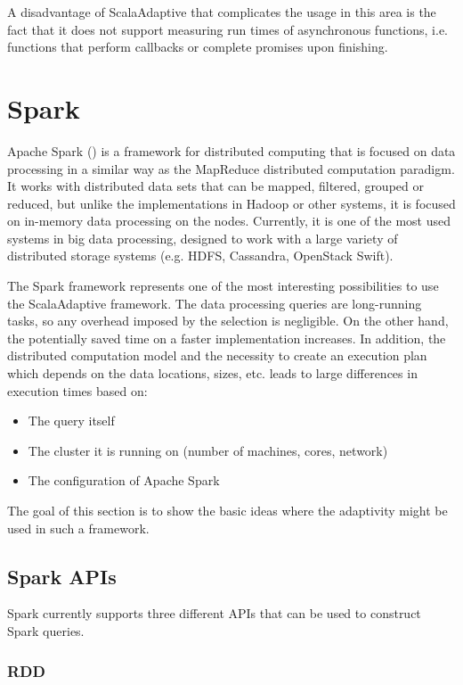 A disadvantage of ScalaAdaptive that complicates the usage in this area is the fact that it does not support measuring run times of asynchronous functions, i.e. functions that perform callbacks or complete promises upon finishing.

\section{Spark}

Apache Spark (\cite{noauthor_apache_nodate}) is a framework for distributed computing that is focused on data processing in a similar way as the MapReduce distributed computation paradigm. It works with distributed data sets that can be mapped, filtered, grouped or reduced, but unlike the implementations in Hadoop or other systems, it is focused on in-memory data processing on the nodes. Currently, it is one of the most used systems in big data processing, designed to work with a large variety of distributed storage systems (e.g. HDFS, Cassandra, OpenStack Swift).

The Spark framework represents one of the most interesting possibilities to use the ScalaAdaptive framework. The data processing queries are long-running tasks, so any overhead imposed by the selection is negligible. On the other hand, the potentially saved time on a faster implementation increases. In addition, the distributed computation model and the necessity to create an execution plan which depends on the data locations, sizes, etc. leads to large differences in execution times based on:

\begin{itemize}
	\item The query itself
	\item The cluster it is running on (number of machines, cores, network)
	\item The configuration of Apache Spark
\end{itemize}

The goal of this section is to show the basic ideas where the adaptivity might be used in such a framework.

\subsection{Spark APIs}
\label{subsec:spark_apis}

Spark currently supports three different APIs that can be used to construct Spark queries.

\subsubsection{RDD}

